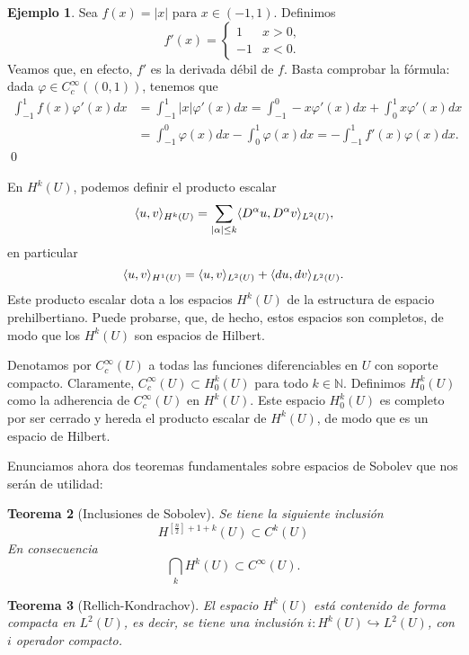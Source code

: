 \documentclass[12pt,a4paper]{article}
\newtheorem{thm}{Teorema}[section]
\theoremstyle{definition} \newtheorem{defn}[thm]{Definición}
\theoremstyle{definition} \newtheorem{ejemplo}[thm]{Ejemplo}
\theoremstyle{definition} \newtheorem{ejercicio}[thm]{Ejercicio}
\theoremstyle{remark} \newtheorem*{obs}{Observación}
\DeclarePairedDelimiter\esc{\langle}{\rangle}
\newcommand{\NN}{\mathbb{N}}
\begin{document}
\begin{ejemplo}
  Sea $f(x)=|x|$ para $x\in (-1,1)$. Definimos
  \begin{equation*}
    f'(x)=
    \begin{cases}
      1 & x >0, \\
      -1 & x<0.
    \end{cases}
  \end{equation*}
  Veamos que, en efecto, $f'$ es la derivada débil de $f$. Basta comprobar la fórmula: dada $\varphi \in C^{\infty}_c((0,1))$, tenemos que
  \begin{align*}
    \int_{-1}^1 f(x) \varphi'(x) dx & = \int_{-1}^1 |x| \varphi'(x) dx = \int_{-1}^0 -x\varphi'(x) dx + \int_0^1 x \varphi'(x) dx \\ & = \int_{-1}^0 \varphi(x) dx - \int_0^1 \varphi(x) dx = -\int_{-1}^1 f'(x) \varphi(x) dx.
  \end{align*}
  \qed
\end{ejemplo}

  En $H^k(U)$, podemos definir el producto escalar
  \begin{equation*}
    \esc{u,v}_{H^k(U)}=\sum_{|\alpha|\leq k} \esc{D^\alpha u, D^\alpha v}_{L^2(U)},   
  \end{equation*}
  en particular
  \begin{equation*}
    \esc{u,v}_{H^1(U)}=\esc{u,v}_{L^2(U)}+\esc{du, d v}_{L^2(U)}.
  \end{equation*}
  Este producto escalar dota a los espacios $H^k(U)$ de la estructura de espacio prehilbertiano. Puede probarse, que, de hecho, estos espacios son completos, de modo que los $H^k(U)$ son espacios de Hilbert.

  Denotamos por $C^\infty_c(U)$ a todas las funciones diferenciables en $U$ con soporte compacto. Claramente, $C^\infty_c(U) \subset H^k_0(U)$ para todo $k\in \NN$. Definimos $H^k_0(U)$ como la adherencia de $C^\infty_c(U)$ en $H^k(U)$. Este espacio $H^k_0(U)$ es completo por ser cerrado y hereda el producto escalar de $H^k(U)$, de modo que es un espacio de Hilbert.

  Enunciamos ahora dos teoremas fundamentales sobre espacios de Sobolev que nos serán de utilidad:
  \begin{thm}[Inclusiones de Sobolev]
    Se tiene la siguiente inclusión
    \begin{equation*}
      H^{\left[ \frac{n}{2} \right]+1+k}(U) \subset C^k(U)
    \end{equation*}
    En consecuencia
    \begin{equation*}
      \bigcap_{k} H^k(U) \subset C^{\infty}(U).
    \end{equation*}
  \end{thm}
  \begin{thm}[Rellich-Kondrachov]
    El espacio $H^k(U)$ está \emph{contenido de forma compacta} en $L^2(U)$, es decir, se tiene una inclusión
$i:	H^k(U) \hookrightarrow L^2(U)$,
    con $i$ operador compacto.
  \end{thm}
\end{document}
